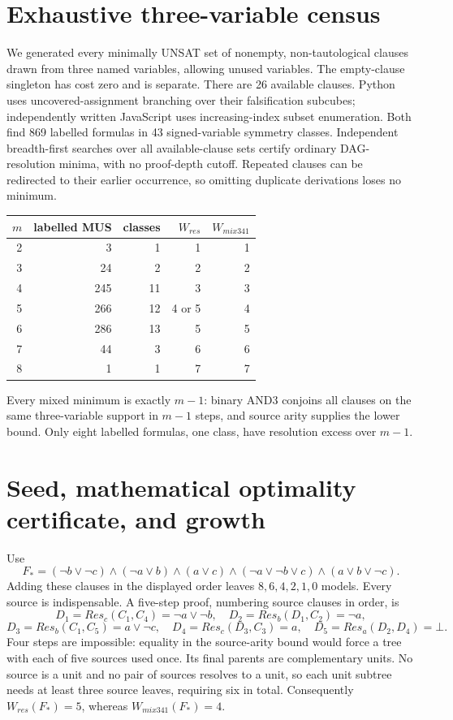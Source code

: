 \documentclass[11pt]{article}
\begin{document}
\section{Exhaustive three-variable census}
We generated every minimally UNSAT set of nonempty, non-tautological clauses drawn from three named variables, allowing unused variables. The empty-clause singleton has cost zero and is separate. There are 26 available clauses. Python uses uncovered-assignment branching over their falsification subcubes; independently written JavaScript uses increasing-index subset enumeration. Both find 869 labelled formulas in 43 signed-variable symmetry classes. Independent breadth-first searches over all available-clause sets certify ordinary DAG-resolution minima, with no proof-depth cutoff. Repeated clauses can be redirected to their earlier occurrence, so omitting duplicate derivations loses no minimum.
\begin{center}\begin{tabular}{rrrrr}\toprule
$m$&labelled MUS&classes&$W_{res}$&$W_{mix341}$\\\midrule
2&3&1&1&1\\3&24&2&2&2\\4&245&11&3&3\\5&266&12&4 or 5&4\\6&286&13&5&5\\7&44&3&6&6\\8&1&1&7&7\\\bottomrule
\end{tabular}\end{center}
Every mixed minimum is exactly $m-1$: binary AND3 conjoins all clauses on the same three-variable support in $m-1$ steps, and source arity supplies the lower bound. Only eight labelled formulas, one class, have resolution excess over $m-1$.

\section{Seed, mathematical optimality certificate, and growth}
Use
\[
F_*=(\neg b\vee\neg c)\wedge(\neg a\vee b)\wedge(a\vee c)
\wedge(\neg a\vee\neg b\vee c)\wedge(a\vee b\vee\neg c).
\]
Adding these clauses in the displayed order leaves $8,6,4,2,1,0$ models. Every source is indispensable. A five-step proof, numbering source clauses in order, is
\[
D_1=Res_c(C_1,C_4)=\neg a\vee\neg b,
\quad D_2=Res_b(D_1,C_2)=\neg a,
\]
\[
D_3=Res_b(C_1,C_5)=a\vee\neg c,
\quad D_4=Res_c(D_3,C_3)=a,
\quad D_5=Res_a(D_2,D_4)=\bot.
\]
Four steps are impossible: equality in the source-arity bound would force a tree with each of five sources used once. Its final parents are complementary units. No source is a unit and no pair of sources resolves to a unit, so each unit subtree needs at least three source leaves, requiring six in total. Consequently $W_{res}(F_*)=5$, whereas $W_{mix341}(F_*)=4$.
\end{document}
